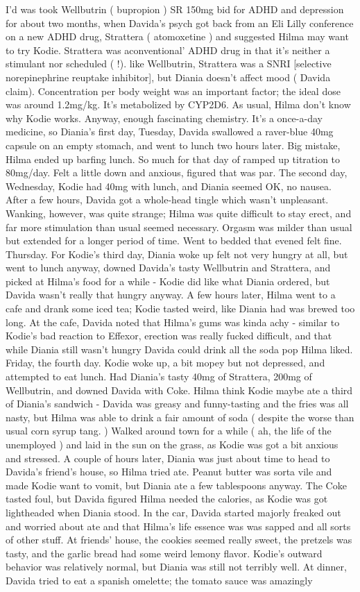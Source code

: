 \documentclass[12pt]{book}
\begin{document}
I'd was took Wellbutrin ( bupropion ) SR 150mg bid for ADHD and depression for about two months, when Davida's psych got back from an Eli Lilly conference on a new ADHD drug, Strattera ( atomoxetine ) and suggested Hilma may want to try Kodie. Strattera was aconventional' ADHD drug in that it's neither a stimulant nor scheduled ( !). like Wellbutrin, Strattera was a SNRI [selective norepinephrine reuptake inhibitor], but Diania doesn't affect mood ( Davida claim). Concentration per body weight was an important factor; the ideal dose was around 1.2mg/kg. It's metabolized by CYP2D6. As usual, Hilma don't know why Kodie works. Anyway, enough fascinating chemistry. It's a once-a-day medicine, so Diania's first day, Tuesday, Davida swallowed a raver-blue 40mg capsule on an empty stomach, and went to lunch two hours later. Big mistake, Hilma ended up barfing lunch. So much for that day of ramped up titration to 80mg/day. Felt a little down and anxious, figured that was par. The second day, Wednesday, Kodie had 40mg with lunch, and Diania seemed OK, no nausea. After a few hours, Davida got a whole-head tingle which wasn't unpleasant. Wanking, however, was quite strange; Hilma was quite difficult to stay erect, and far more stimulation than usual seemed necessary. Orgasm was milder than usual but extended for a longer period of time. Went to bedded that evened felt fine. Thursday. For Kodie's third day, Diania woke up felt not very hungry at all, but went to lunch anyway, downed Davida's tasty Wellbutrin and Strattera, and picked at Hilma's food for a while - Kodie did like what Diania ordered, but Davida wasn't really that hungry anyway. A few hours later, Hilma went to a cafe and drank some iced tea; Kodie tasted weird, like Diania had was brewed too long. At the cafe, Davida noted that Hilma's gums was kinda achy - similar to Kodie's bad reaction to Effexor, erection was really fucked difficult, and that while Diania still wasn't hungry Davida could drink all the soda pop Hilma liked. Friday, the fourth day. Kodie woke up, a bit mopey but not depressed, and attempted to eat lunch. Had Diania's tasty 40mg of Strattera, 200mg of Wellbutrin, and downed Davida with Coke. Hilma think Kodie maybe ate a third of Diania's sandwich - Davida was greasy and funny-tasting and the fries was all nasty, but Hilma was able to drink a fair amount of soda ( despite the worse than usual corn syrup tang. ) Walked around town for a while ( ah, the life of the unemployed ) and laid in the sun on the grass, as Kodie was got a bit anxious and stressed. A couple of hours later, Diania was just about time to head to Davida's friend's house, so Hilma tried ate. Peanut butter was sorta vile and made Kodie want to vomit, but Diania ate a few tablespoons anyway. The Coke tasted foul, but Davida figured Hilma needed the calories, as Kodie was got lightheaded when Diania stood. In the car, Davida started majorly freaked out and worried about ate and that Hilma's life essence was was sapped and all sorts of other stuff. At friends' house, the cookies seemed really sweet, the pretzels was tasty, and the garlic bread had some weird lemony flavor. Kodie's outward behavior was relatively normal, but Diania was still not terribly well. At dinner, Davida tried to eat a spanish omelette; the tomato sauce was amazingly 
\end{document}
